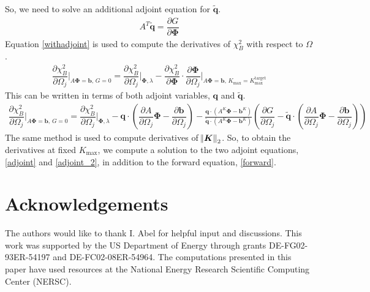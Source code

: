 \documentclass[aps,unsortedaddress]{revtex4-1}
\newcommand{\partder}[2]{\dfrac{\partial  #1}{\partial  #2}}
\begin{document}
So, we need to solve an additional adjoint equation for $\tilde{\bm{q}}$.
\begin{gather}
A^T \tilde{\bm{q}} = \partder{G}{\bm{\Phi}}
\label{adjoint_2}
\end{gather}
Equation \ref{withadjoint} is used to compute the derivatives of $\chi^2_B$ with respect to $\Omega$.
\begin{gather}
\partder{\chi^2_B}{\Omega_j} \bigg \rvert_{A \bm{\Phi} = \bm{b}, \, G = 0} = \partder{\chi^2_B}{\Omega_j} \bigg \rvert_{\bm{\Phi}, \lambda} - \partder{\chi^2_B}{\bm{\Phi}} \cdot \partder{\bm{\Phi}}{\Omega_j} \bigg \rvert_{A \bm{\Phi} = \bm{b}, \, K_{\text{max}} = K_{\text{max}}^{\text{target}}}
\end{gather}
This can be written in terms of both adjoint variables, $\bm{q}$ and $\tilde{\bm{q}}$. 
\begin{multline}
\partder{\chi^2_B}{\Omega_j} \bigg \rvert_{A \bm{\Phi} = \bm{b}, \, G = 0} = \partder{\chi^2_B}{\Omega_j} \bigg \rvert_{\bm{\Phi}, \lambda} - \bm{q} \cdot \left( \partder{A}{\Omega_j} \bm{\Phi} - \partder{\bm{b}}{\Omega_j} \right) - \frac{ \bm{q} \cdot \left(A^K \bm{\Phi} - \bm{b}^K \right)}{  \tilde{\bm{q}} \cdot \left( A^K \bm{\Phi} - \bm{b}^K \right) } \left( \partder{G}{\Omega_j} - \tilde{\bm{q}} \cdot \left( \partder{A}{\Omega_j} \bm{\Phi} - \partder{\bm{b}}{\Omega_j} \right) \right)
\end{multline}
The same method is used to compute derivatives of $\norm{\bm{K}}_2$. So, to obtain the derivatives at fixed $K_{\text{max}}$, we compute a solution to the two adjoint equations, \ref{adjoint} and \ref{adjoint_2}, in addition to the forward equation, \ref{forward}.

\section*{Acknowledgements}
The authors would like to thank I. Abel for helpful input and discussions. This work was supported by the US Department of Energy through grants DE-FG02-93ER-54197 and DE-FC02-08ER-54964. The computations presented in this paper have used resources at the National Energy Research Scientific Computing Center (NERSC). 

\raggedright


\end{document}
